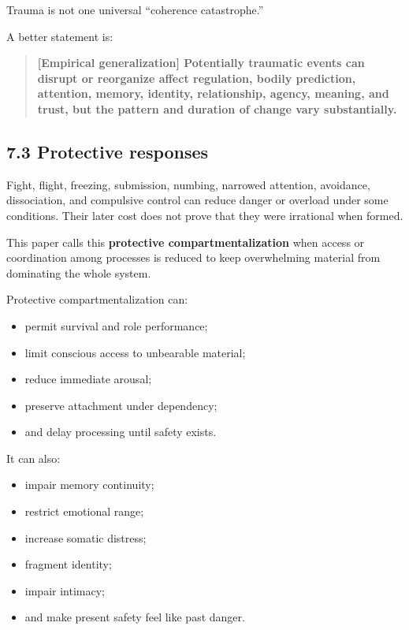 \documentclass[
  11pt,
]{article}
\providecommand{\tightlist}{%
  \setlength{\itemsep}{0pt}\setlength{\parskip}{0pt}}
\begin{document}
Trauma is not one universal ``coherence catastrophe.''

A better statement is:

\begin{quote}
\textbf{{[}Empirical generalization{]} Potentially traumatic events can
disrupt or reorganize affect regulation, bodily prediction, attention,
memory, identity, relationship, agency, meaning, and trust, but the
pattern and duration of change vary substantially.}
\end{quote}

\subsection{7.3 Protective responses}\label{protective-responses}

Fight, flight, freezing, submission, numbing, narrowed attention,
avoidance, dissociation, and compulsive control can reduce danger or
overload under some conditions. Their later cost does not prove that
they were irrational when formed.

This paper calls this \textbf{protective compartmentalization} when
access or coordination among processes is reduced to keep overwhelming
material from dominating the whole system.

Protective compartmentalization can:

\begin{itemize}
\tightlist
\item
  permit survival and role performance;
\item
  limit conscious access to unbearable material;
\item
  reduce immediate arousal;
\item
  preserve attachment under dependency;
\item
  and delay processing until safety exists.
\end{itemize}

It can also:

\begin{itemize}
\tightlist
\item
  impair memory continuity;
\item
  restrict emotional range;
\item
  increase somatic distress;
\item
  fragment identity;
\item
  impair intimacy;
\item
  and make present safety feel like past danger.
\end{itemize}
\end{document}
